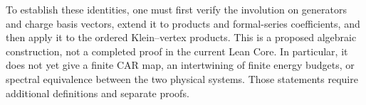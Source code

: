 To establish these identities, one must first verify the involution on
generators and charge basis vectors, extend it to products and
formal-series coefficients, and then apply it to the ordered
Klein--vertex products. This is a proposed algebraic construction, not a
completed proof in the current Lean Core. In particular, it does not yet
give a finite CAR map, an intertwining of finite energy budgets, or spectral
equivalence between the two physical systems. Those statements require
additional definitions and separate proofs.
